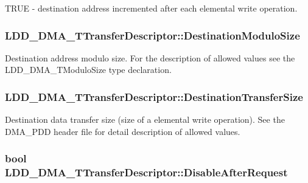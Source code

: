 T\-R\-U\-E -\/ destination address incremented after each elemental write operation. \hypertarget{struct_l_d_d___d_m_a___t_transfer_descriptor_a2d9a37eb9dc192ae554e0dca033a1e3e}{
\subsubsection[{Destination\-Modulo\-Size}]{ L\-D\-D\-\_\-\-D\-M\-A\-\_\-\-T\-Transfer\-Descriptor\-::\-Destination\-Modulo\-Size}}\label{struct_l_d_d___d_m_a___t_transfer_descriptor_a2d9a37eb9dc192ae554e0dca033a1e3e}
Destination address modulo size. For the description of allowed values see the L\-D\-D\-\_\-\-D\-M\-A\-\_\-\-T\-Modulo\-Size type declaration. \hypertarget{struct_l_d_d___d_m_a___t_transfer_descriptor_aab2978b1b8d4a4774a5e2c298d58479f}{
\subsubsection[{Destination\-Transfer\-Size}]{ L\-D\-D\-\_\-\-D\-M\-A\-\_\-\-T\-Transfer\-Descriptor\-::\-Destination\-Transfer\-Size}}\label{struct_l_d_d___d_m_a___t_transfer_descriptor_aab2978b1b8d4a4774a5e2c298d58479f}
Destination data transfer size (size of a elemental write operation). See the D\-M\-A\-\_\-\-P\-D\-D header file for detail description of allowed values. \hypertarget{struct_l_d_d___d_m_a___t_transfer_descriptor_af47462df9934c927bd3cb1c8c7a4aa94}{
\subsubsection[{Disable\-After\-Request}]{\setlength{\rightskip}{0pt plus 5cm}bool L\-D\-D\-\_\-\-D\-M\-A\-\_\-\-T\-Transfer\-Descriptor\-::\-Disable\-After\-Request}}\label{struct_l_d_d___d_m_a___t_transfer_descriptor_af47462df9934c927bd3cb1c8c7a4aa94}

